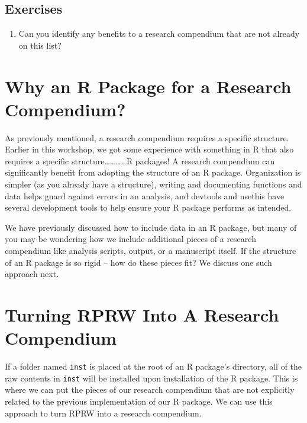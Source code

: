 \documentclass[
]{book}
\providecommand{\tightlist}{%
  \setlength{\itemsep}{0pt}\setlength{\parskip}{0pt}}
\begin{document}
\hypertarget{ex-set8}{%
\subsection{Exercises}\label{ex-set8}}

\begin{enumerate}
\def\labelenumi{\arabic{enumi}.}
\tightlist
\item
  Can you identify any benefits to a research compendium that are not already on this list?
\end{enumerate}

\hypertarget{why-r-pack-for-rc}{%
\section{Why an R Package for a Research Compendium?}\label{why-r-pack-for-rc}}

As previously mentioned, a research compendium requires a specific structure. Earlier in this workshop, we got some experience with something in R that also requires a specific structure\ldots\ldots\ldots\ldots R packages! A research compendium can significantly benefit from adopting the structure of an R package. Organization is simpler (as you already have a structure), writing and documenting functions and data helps guard against errors in an analysis, and devtools and usethis have several development tools to help ensure your R package performs as intended.

We have previously discussed how to include data in an R package, but many of you may be wondering how we include additional pieces of a research compendium like analysis scripts, output, or a manuscript itself. If the structure of an R package is so rigid -- how do these pieces fit? We discuss one such approach next.

\hypertarget{rprw-to-rc}{%
\section{Turning RPRW Into A Research Compendium}\label{rprw-to-rc}}

If a folder named \texttt{inst} is placed at the root of an R package's directory, all of the raw contents in \texttt{inst} will be installed upon installation of the R package. This is where we can put the pieces of our research compendium that are not explicitly related to the previous implementation of our R package. We can use this approach to turn RPRW into a research compendium.
\end{document}
